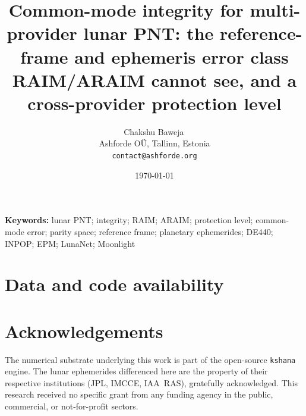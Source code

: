 \documentclass[11pt]{article}
\title{\textbf{Common-mode integrity for multi-provider lunar PNT: the
reference-frame and ephemeris error class RAIM/ARAIM cannot see, and a
cross-provider protection level}}
\author{Chakshu Baweja\,\orcidlink{0009-0008-2098-0751}\\
\small Ashforde O\"U, Tallinn, Estonia \\
\small \texttt{contact@ashforde.org}}
\date{\today}
\theoremstyle{definition}
\newcommand{\code}[1]{\texttt{#1}}
\begin{document}
\maketitle

\begin{abstract}

\end{abstract}

\noindent\textbf{Keywords:} lunar PNT; integrity; RAIM; ARAIM; protection level;
common-mode error; parity space; reference frame; planetary ephemerides; DE440;
INPOP; EPM; LunaNet; Moonlight

\vspace{0.5em}









\section*{Data and code availability}


\section*{Acknowledgements}
The numerical substrate underlying this work is part of the open-source
\code{kshana} engine. The lunar ephemerides differenced here are the property of
their respective institutions (JPL, IMCCE, IAA~RAS), gratefully acknowledged. This
research received no specific grant from any funding agency in the public,
commercial, or not-for-profit sectors.




\appendix

\end{document}
